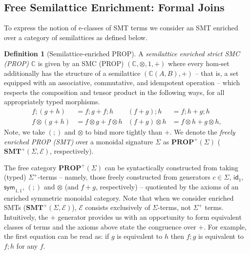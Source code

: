 \documentclass[sigconf, 9pt, nonacm]{acmart}
\theoremstyle{definition}
\newtheorem{definition}[thm]{Definition}
\newcommand\sym{\textsf{sym}}
\begin{document}
\subsection{Free Semilattice Enrichment: Formal Joins}

To express the notion of e-classes of SMT terms we consider an SMT enriched over a category of semilattices as defined below.

\begin{definition}[Semilattice-enriched PROP]\label{def:enriched-prop}
A \textit{semilattice enriched strict SMC (PROP)}  $\mathbb{C}$ is given by an SMC (PROP) $(\mathbb{C}, \otimes, 1,+)$ where every hom-set additionally has the structure of a semilattice $(\mathbb{C}(A,B), +)$ -- that is,  a set equipped with an associative,  commutative,  and idempotent operation -- which respects the composition and tensor product in the following ways,  for all appropriately typed morphisms. 
\begin{align*}
f ; (g+h) &= f;g + f;h &
(f+g) ; h &= f;h + g;h \\
f \otimes (g+h) &= f \otimes g + f \otimes h & 
(f+g) \otimes h &= f \otimes h + g \otimes h,
\end{align*}
Note,  we take $(;\!)$ and $\otimes$ to bind more tightly than $+$.
We denote the \textit{freely enriched PROP (SMT)} over a monoidal signature $\Sigma$ as $\textbf{PROP}^+(\Sigma)$ ($\textbf{SMT}^+(\Sigma, \mathcal{E})$,  respectively).
\end{definition}

The free category $\textbf{PROP}^+(\Sigma)$ can be syntactically constructed from taking (typed) $\Sigma^+$-terms  -- namely, those freely constructed from generators $c \in \Sigma$, $\textsf{id}_1$, $\sym_{1,1}$, $(;\!)$ and $\otimes$ (and $f+g$, respectively) -- quotiented by the axioms of an enriched symmetric monoidal category.
Note that when we consider enriched SMTs ($\textbf{SMT}^{+}(\Sigma,\mathcal{E})$), $\mathcal{E}$ consists exclusively of $\Sigma$-terms, not $\Sigma^{+}$ terms.
Intuitively, the $+$ generator provides us with an opportunity to form equivalent classes of terms and the axioms above state the congruence over $+$.
For example, the first equation can be read as: if $g$ is equivalent to $h$ then $f;g$ is equivalent to $f;h$ for any $f$.
\end{document}
